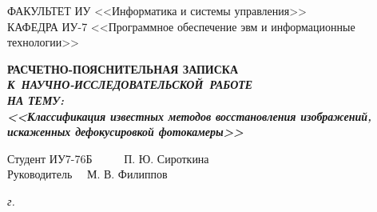 \begin{titlepage}
	{
		\small \raggedright
		ФАКУЛЬТЕТ ИУ <<Информатика и системы управления>> \\
		\vspace{3.3mm}
		КАФЕДРА ИУ-7 <<Программное обеспечение эвм и информационные технологии>> \\
	}

	\vspace{20.8mm}

	{
		\Large \bfseries
		РАСЧЕТНО-ПОЯСНИТЕЛЬНАЯ ЗАПИСКА \\
	}
	\vspace{5mm}
	{
		\Large \bfseries \slshape
		К~НАУЧНО-ИССЛЕДОВАТЕЛЬСКОЙ~РАБОТЕ \\
	}
	\vspace{5mm}
	{
		\Large \bfseries \slshape
		НА ТЕМУ: \\
		\vspace{5mm}
		<<Классификация известных методов восстановления изображений, искаженных дефокусировкой фотокамеры>>
	}

	\vfill

	Студент \hspace*{2.5cm} ИУ7-76Б \hfill \uline{} ~~~~~П. Ю. Сироткина~~~~\\
	
	Руководитель \hfill \uline{} 
	~~М. В. Филиппов~~\\
	
	\vspace{14mm}
	
	\textsl{{\the\year} г.}
	
\end{titlepage}